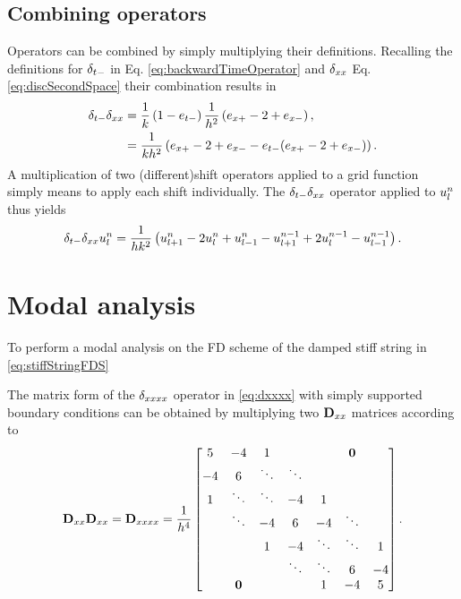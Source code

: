 \subsection{Combining operators}\label{sec:combiningOperators}
Operators can be combined by simply multiplying their definitions. Recalling the definitions for $\delta_{t-}$ in Eq. \eqref{eq:backwardTimeOperator} and $\delta_{xx}$ Eq. \eqref{eq:discSecondSpace} their combination results in
\begin{align*}
    \delta_{t-}\delta_{xx} &= \frac{1}{k}\left(1-e_{t-}\right)\frac{1}{h^2}\left(e_{x+}-2+e_{x-}\right), \\
    &= \frac{1}{kh^2}\left(e_{x+}-2+e_{x-} - e_{t-}(e_{x+}-2+e_{x-})\right).
\end{align*}
%
A multiplication of two (different)shift operators applied to a grid function simply means to apply each shift individually. The $\delta_{t-}\delta_{xx}$ operator applied to $u_l^n$ thus yields
\begin{equation}
    \delta_{t-} \delta_{xx} u_l^n = \frac{1}{hk^2}\left(u_{l+1}^n - 2 u_l^n + u_{l-1}^n - u_{l+1}^{n-1} + 2 u_l^{n-1} - u_{l-1}^{n-1}\right).
\end{equation}



\section{Modal analysis}
To perform a modal analysis on the FD scheme of the damped stiff string in \eqref{eq:stiffStringFDS} 

The matrix form of the $\delta_{xxxx}$ operator in \eqref{eq:dxxxx} with simply supported boundary conditions can be obtained by multiplying two $\mathbf{D}_{xx}$ matrices according to
\begin{equation}
    \mathbf{D}_{xx}\mathbf{D}_{xx} = \mathbf{D}_{xxxx} = \frac{1}{h^4}\begin{bmatrix}
        5& -4 & 1 & & & \mathbf{0}& \\
        -4 & 6 &\ddots &\ddots & & & \\
        1& \ddots & \ddots & -4 & 1 & & \\
        & \ddots& -4 & 6 & -4 & \ddots& \\
        & & 1 & -4 & \ddots & \ddots &1 \\
        & & & \ddots & \ddots & 6 & -4 \\
        & \mathbf{0} & & & 1& -4 & 5 \\
    \end{bmatrix}.
\end{equation}
